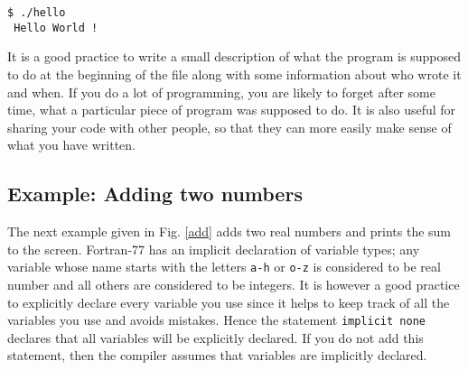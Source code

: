 \documentclass[11pt,oneside]{amsart}
\begin{document}
\begin{verbatim}
$ ./hello
 Hello World !
\end{verbatim}

It is a good practice to write a small description of what the program is supposed to do at the beginning of the file along with some information about who wrote it and when. If you do a lot of programming, you are likely to forget after some time, what a particular piece of program was supposed to do. It is also useful for sharing your code with other people, so that they can more easily make sense of what you have written.

\subsection{Example: Adding two numbers}

The next example given in Fig. \ref{add} adds two real numbers and prints the sum to the screen. Fortran-77 has an implicit declaration of variable types; any variable whose name starts with the letters {\tt a-h} or {\tt o-z} is considered to be real number and all others are considered to be integers. It is however a good practice to explicitly declare every variable you use since it helps to keep track of all the variables you use and avoids mistakes. Hence the statement {\tt implicit none} declares  that all variables will be explicitly declared. If you do not add this statement, then the compiler assumes that variables are implicitly declared.
\end{document}
